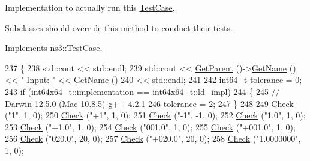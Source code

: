 Implementation to actually run this \hyperlink{classns3_1_1TestCase}{Test\+Case}. 

Subclasses should override this method to conduct their tests. 

Implements \hyperlink{classns3_1_1TestCase_a8ff74680cf017ed42011e4be51917a24}{ns3\+::\+Test\+Case}.


\begin{DoxyCode}
237 \{
238   std::cout << std::endl;
239   std::cout << \hyperlink{classns3_1_1TestCase_af41db0462b844c9f81838d0e61ecd563}{GetParent} ()->\hyperlink{classns3_1_1TestCase_a28f7bb59669c24dae1c290fc17fc9b62}{GetName} () << \textcolor{stringliteral}{" Input: "} << \hyperlink{classns3_1_1TestCase_a28f7bb59669c24dae1c290fc17fc9b62}{GetName} ()
240             << std::endl;
241 
242   int64\_t tolerance = 0;
243   \textcolor{keywordflow}{if} (int64x64\_t::implementation == int64x64\_t::ld\_impl)
244     \{
245       \textcolor{comment}{// Darwin 12.5.0 (Mac 10.8.5) g++ 4.2.1}
246       tolerance = 2;
247     \}
248   
249   \hyperlink{classns3_1_1int64x64_1_1test_1_1Int64x64InputTestCase_ae31646824694557747bd32f1a0e9b818}{Check} (\textcolor{stringliteral}{"1"}, 1, 0);
250   \hyperlink{classns3_1_1int64x64_1_1test_1_1Int64x64InputTestCase_ae31646824694557747bd32f1a0e9b818}{Check} (\textcolor{stringliteral}{"+1"}, 1, 0);
251   \hyperlink{classns3_1_1int64x64_1_1test_1_1Int64x64InputTestCase_ae31646824694557747bd32f1a0e9b818}{Check} (\textcolor{stringliteral}{"-1"}, -1, 0);
252   \hyperlink{classns3_1_1int64x64_1_1test_1_1Int64x64InputTestCase_ae31646824694557747bd32f1a0e9b818}{Check} (\textcolor{stringliteral}{"1.0"}, 1, 0);
253   \hyperlink{classns3_1_1int64x64_1_1test_1_1Int64x64InputTestCase_ae31646824694557747bd32f1a0e9b818}{Check} (\textcolor{stringliteral}{"+1.0"}, 1, 0);
254   \hyperlink{classns3_1_1int64x64_1_1test_1_1Int64x64InputTestCase_ae31646824694557747bd32f1a0e9b818}{Check} (\textcolor{stringliteral}{"001.0"}, 1, 0);
255   \hyperlink{classns3_1_1int64x64_1_1test_1_1Int64x64InputTestCase_ae31646824694557747bd32f1a0e9b818}{Check} (\textcolor{stringliteral}{"+001.0"}, 1, 0);
256   \hyperlink{classns3_1_1int64x64_1_1test_1_1Int64x64InputTestCase_ae31646824694557747bd32f1a0e9b818}{Check} (\textcolor{stringliteral}{"020.0"}, 20, 0);
257   \hyperlink{classns3_1_1int64x64_1_1test_1_1Int64x64InputTestCase_ae31646824694557747bd32f1a0e9b818}{Check} (\textcolor{stringliteral}{"+020.0"}, 20, 0);
258   \hyperlink{classns3_1_1int64x64_1_1test_1_1Int64x64InputTestCase_ae31646824694557747bd32f1a0e9b818}{Check} (\textcolor{stringliteral}{"1.0000000"}, 1, 0);

\end{DoxyCode}
